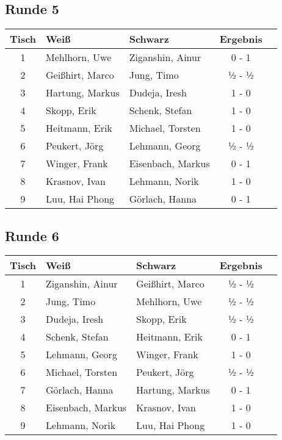 \documentclass[a4paper,ngerman]{tui-algo-seminar}
\begin{document}
\subsection{Runde 5}
\begin{center}
\begin{tabular}{cllcl}
\toprule
\textbf{Tisch} & \textbf{Weiß} & \textbf{Schwarz} & \textbf{Ergebnis} \\
\midrule
1 & Mehlhorn, Uwe & Ziganshin, Ainur & 0 - 1 \\
2 & Geißhirt, Marco & Jung, Timo & ½ - ½ \\
3 & Hartung, Markus & Dudeja, Iresh & 1 - 0 \\
4 & Skopp, Erik & Schenk, Stefan & 1 - 0 \\
5 & Heitmann, Erik & Michael, Torsten & 1 - 0 \\
6 & Peukert, Jörg & Lehmann, Georg & ½ - ½ \\
7 & Winger, Frank & Eisenbach, Markus & 0 - 1 \\
8 & Krasnov, Ivan & Lehmann, Norik & 1 - 0 \\
9 & Luu, Hai Phong & Görlach, Hanna & 0 - 1 \\
\bottomrule
\end{tabular}
\end{center}

\subsection{Runde 6}
\begin{center}
\begin{tabular}{cllcl}
\toprule
\textbf{Tisch} & \textbf{Weiß} & \textbf{Schwarz} & \textbf{Ergebnis} \\
\midrule
1 & Ziganshin, Ainur & Geißhirt, Marco & ½ - ½ \\
2 & Jung, Timo & Mehlhorn, Uwe & ½ - ½ \\
3 & Dudeja, Iresh & Skopp, Erik & ½ - ½ \\
4 & Schenk, Stefan & Heitmann, Erik & 0 - 1 \\
5 & Lehmann, Georg & Winger, Frank & 1 - 0 \\
6 & Michael, Torsten & Peukert, Jörg & ½ - ½ \\
7 & Görlach, Hanna & Hartung, Markus & 0 - 1 \\
8 & Eisenbach, Markus & Krasnov, Ivan & 1 - 0 \\
9 & Lehmann, Norik & Luu, Hai Phong & 1 - 0 \\
\bottomrule
\end{tabular}
\end{center}
\end{document}
